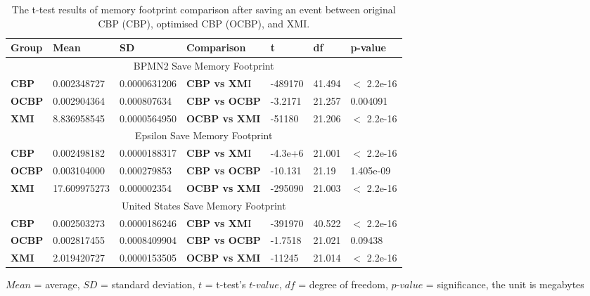 \documentclass{llncs}
\begin{document}
    \begin{table}
        \small
        \centering
        \caption{The t-test results of memory footprint comparison after saving an event between original CBP (CBP), optimised CBP (OCBP), and XMI.}
        \label{table:ttest_results_save_memory}
        \begin{tabular}
            {|p{}|p{}|p{}|p{}|p{}|p{}|p{}|}
            \hline 
            
            \textbf{Group} & \textbf{Mean} & \textbf{SD} & \textbf{Comparison} & \textbf{t}  & \textbf{df} & \textbf{p-value} \\  
            \hline 
            \multicolumn{7}{|c|}{BPMN2 Save Memory Footprint} \\
            \hline 
            \textbf{CBP} &0.002348727    & 0.0000631206 & \textbf{CBP vs XM}I &  -489170    & 41.494 & $<$ 2.2e-16 \\  
            \hline 
            \textbf{OCBP} &0.002904364    & 0.000807634 & \textbf{CBP vs OCBP} & -3.2171 & 21.257 & 0.004091 \\  
            \hline 
            \textbf{XMI} & 8.836958545   & 0.0000564950 & \textbf{OCBP vs XMI} & -51180    &  21.206  & $<$ 2.2e-16 \\ 
            \hline 
            
            \multicolumn{7}{|c|}{Epsilon Save Memory Footprint} \\
            \hline 
            \textbf{CBP} & 0.002498182    & 0.0000188317 &  \textbf{CBP vs XM}I & -4.3e+6   & 21.001 & $<$ 2.2e-16 \\
            \hline 
            \textbf{OCBP} & 0.003104000    &  0.000279853 & \textbf{CBP vs OCBP} & -10.131 & 21.19 & 1.405e-09 \\  
            \hline 
            \textbf{XMI} & 17.609975273   & 0.000002354 & \textbf{OCBP vs XMI} & -295090  &21.003  & $<$ 2.2e-16 \\ 
            \hline 
            
            \multicolumn{7}{|c|}{United States Save Memory Footprint} \\
            \hline 
            \textbf{CBP} & 0.002503273  &0.0000186246 & \textbf{CBP vs XM}I &  -391970   & 40.522 & $<$ 2.2e-16 \\ 
            \hline 
            \textbf{OCBP} &  0.002817455   &  0.0008409904 & \textbf{CBP vs OCBP} &  -1.7518 & 21.021 &  0.09438 \\ 
            \hline 
            \textbf{XMI} &  2.019420727   & 0.0000153505 & \textbf{OCBP vs XMI} &  -11245  & 21.014 & $<$ 2.2e-16 \\ 
            \hline
        \end{tabular}
        \justify
        $Mean$ = average, $SD$ = standard deviation, $t$ = t-test's $t$-$value$, $df$ = degree of freedom, $p$-$value$ = significance, the unit is megabytes
    \end{table}
    
\end{document}
